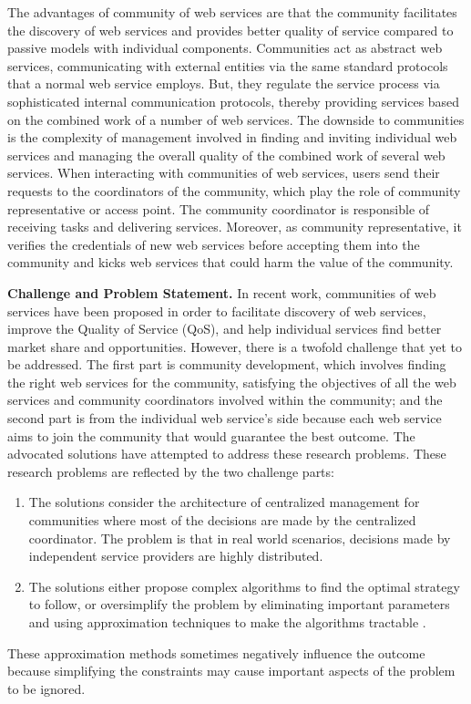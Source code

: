 The advantages of community of web services are that the community facilitates the discovery of web services and provides better quality of service compared to passive models with individual components. Communities act as abstract web services, communicating with external entities via the same standard protocols that a normal web service employs. But, they regulate the service process via sophisticated internal communication protocols, thereby providing services based on the combined work of a number of web services. The downside to communities is the complexity of management involved in finding and inviting individual web services and managing the overall quality of the combined work of several web services.
When interacting with communities of web services, users send their requests to the coordinators of the community, which play the role of community representative or access point. The community coordinator is responsible of receiving tasks and delivering services. Moreover, as community representative, it verifies the credentials of new web services before accepting them into the community and kicks web services that could harm the value of the community.

\textbf{Challenge and Problem Statement.} In recent work, communities of web services have been proposed in order to facilitate discovery of web services, improve the Quality of Service (QoS), and help individual services find better market share and opportunities. However, there is a twofold challenge that yet to be addressed. The first part is community development, which involves finding the right web services for the community, satisfying the objectives of all the web services and community coordinators involved within the community; and the second part is from the individual web service's side because each web service aims to join the community that would guarantee the best outcome. The advocated solutions \cite{conf/webist/MaamarLBTS07, 10.1109/ARES.2008.7, journals/soca/XuYLZB11, 10.1109/TSC.2012.12, managing-hela-jalel, DBLP:conf/IEEEscc/KhosravifarABT11, DBLP:conf/IEEEscc/LimTMB12} have attempted to address these research problems. These research problems are reflected by the two challenge parts:
\begin{enumerate}
	\item The solutions consider the architecture of centralized management for communities where most of the decisions are made by the centralized coordinator. The problem is that in real world scenarios, decisions made by independent service providers are highly distributed.
	\item The solutions either propose complex algorithms \cite{DBLP:conf/IEEEscc/LimTMB12, 10.1109/TSC.2012.12, 10.1109/TSC.2014.2312940} to find the optimal strategy to follow, or oversimplify the problem by eliminating important parameters and using approximation techniques to make the algorithms tractable \cite{10.1109/TSC.2012.12}.
\end{enumerate}
These approximation methods sometimes negatively influence the outcome because simplifying the constraints may cause important aspects of the problem to be ignored.

